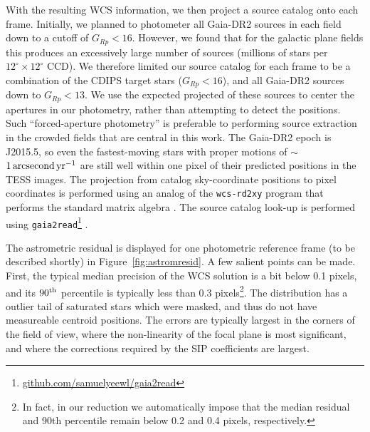 \documentclass[12pt,twocolumn,tighten]{aastex62}
\begin{document}
With the resulting WCS information, we then project a source catalog
onto each frame.  Initially, we planned to photometer all Gaia-DR2
sources in each field down to a cutoff of $G_{Rp} < 16$.  However, we
found that for the galactic plane fields this produces an excessively
large number of sources (millions of stars per
$12^\circ\times12^\circ$ CCD).  We therefore limited our source
catalog for each frame to be
a combination of the CDIPS target stars ($G_{Rp} < 16$), and
all Gaia-DR2 sources down to $G_{Rp} < 13$.  We use the expected
projected of these sources to center the apertures in our photometry,
rather than attempting to detect the positions.  Such
``forced-aperture photometry'' is preferable to performing source
extraction in the crowded fields that are central in this work.  The
Gaia-DR2 epoch is J2015.5, so even the fastest-moving stars with
proper motions of $\sim$$1\,{\rm arcsecond}\,{\rm yr}^{-1}$ are still
well within one pixel of their predicted positions in the TESS images.
The projection from catalog sky-coordinate positions to pixel
coordinates is performed using an analog of the \texttt{wcs-rd2xy}
program that performs the standard matrix algebra \citep{lang_2010}.
The source catalog look-up is performed using
\texttt{gaia2read}\footnote{\url{github.com/samuelyeewl/gaia2read}}
\citep{kim_2018_gaia2read}.

The astrometric residual is displayed for one photometric reference
frame (to be described shortly) in
Figure~\ref{fig:astromresid}.
A few salient points can be made.
First, the typical median precision of the WCS solution is a bit below
0.1 pixels, and its $90^{\rm th}$ percentile is typically less than
0.3 pixels\footnote{In fact, in our reduction we automatically impose
that the median residual and 90th percentile remain below 0.2 and 0.4
pixels, respectively.}.
The distribution has a outlier tail of saturated stars which were
masked, and thus do not have measureable centroid positions.
The errors are typically largest in the corners of the field of view,
where the non-linearity of the focal plane is most significant, and
where the corrections required by the SIP coefficients are largest.
\end{document}
